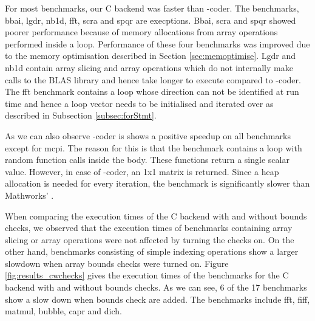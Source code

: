 For most benchmarks, our C backend was faster than \matlab-coder. The benchmarks, bbai, lgdr, nb1d, fft, scra and spqr are execptions. Bbai, scra and spqr showed poorer performance because of memory allocations from array operations performed inside a loop. Performance of these four benchmarks was improved due to the memory optimisation described in Section \ref{sec:memoptimise}. Lgdr and nb1d contain array slicing and array operations which do not internally make calls to the BLAS library and hence take longer to execute compared to \matlab-coder. The fft benchmark contains a loop whose direction can not be identified at run time and hence a loop vector needs to be initialised and iterated over as described in Subsection \ref{subsec:forStmt}. 

As we can also observe \matlab-coder is shows a positive speedup on all benchmarks except for mcpi. The reason for this is that the benchmark contains a loop with random function calls inside the body. These functions return a single scalar value. However, in case of \matlab-coder, an 1x1 matrix is returned. Since a heap allocation is needed for every iteration, the benchmark is significantly slower than Mathworks' \matlab. 

When comparing the execution times of the C backend with and without bounds checks, we observed that the execution times of benchmarks containing array slicing or array operations were not affected by turning the checks on. On the other hand, benchmarks consisting of simple indexing operations show a larger slowdown when array bounds checks were turned on. Figure \ref{fig:results_cwchecks} gives the execution times of the \matlab benchmarks for the C backend with and without bounds checks. As we can see, 6 of the 17 benchmarks show a slow down when bounds check are added. The benchmarks include fft, fiff, matmul, bubble, capr and dich.

